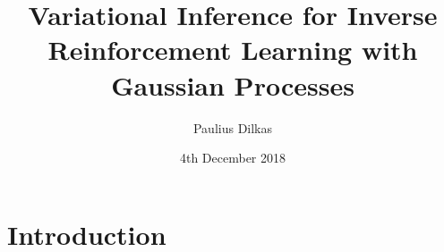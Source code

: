 \documentclass{mprop}
\theoremstyle{definition}
\begin{document}
\title{Variational Inference for Inverse Reinforcement Learning with Gaussian
  Processes}
\author{Paulius Dilkas}
\date{4th December 2018}
\maketitle
\tableofcontents
\newpage

\newcommand{\Kuu}{\mathbf{K}_{\mathbf{u},\mathbf{u}}}
\newcommand{\Krr}{\mathbf{K}_{\mathbf{r},\mathbf{r}}}
\newcommand{\Kru}{\mathbf{K}_{\mathbf{r},\mathbf{u}}}

\newcommand{\DKL}{D_{\mathrm{KL}}}

\newcommand{\pfull}{p(\mathcal{D}, \bm\lambda, \mathbf{X_u}, \mathbf{u}, \mathbf{r})}
\newcommand{\pfullS}{p(\mathcal{D}, \bm\lambda_s, \mathbf{X_u}, \mathbf{u}_s, \mathbf{r}_s)}
\newcommand{\posterior}{p(\bm\lambda, \mathbf{u}, \mathbf{r} | \mathcal{D}, \mathbf{X_u})}
\newcommand{\approximation}{q_{\bm\nu}(\bm\lambda, \mathbf{u}, \mathbf{r})}
\newcommand{\approximationS}{q_{\bm\nu}(\bm\lambda_s, \mathbf{u}_s, \mathbf{r}_s)}

\newcommand{\Eq}{\mathbb{E}_{(\bm\lambda, \mathbf{u}, \mathbf{r}) \sim \approximation}}

\section{Introduction}
\end{document}
